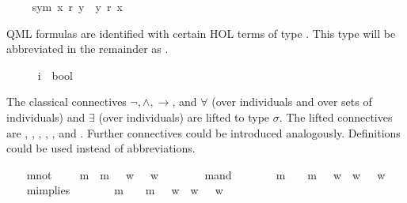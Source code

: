 \begin{isabellebody}
\ \ \isamarkupfalse%
\ \ sym{\isacharcolon}\ {\isachardoublequoteopen}x\ r\ y\ {\isasymlongrightarrow}\ y\ r\ x{\isachardoublequoteclose}%
\begin{isamarkuptext}%
QML formulas are identified with certain HOL terms of type . 
This type will be abbreviated in the remainder as \isa{{\isasymsigma}}.%
\end{isamarkuptext}%
\isamarkuptrue%
\ \ \isamarkupfalse%
\ {\isasymsigma}\ {\isacharequal}\ {\isachardoublequoteopen}{\isacharparenleft}i\ {\isasymRightarrow}\ bool{\isacharparenright}{\isachardoublequoteclose}%
\begin{isamarkuptext}%
The classical connectives $\neg, \wedge, \rightarrow$, and $\forall$
(over individuals and over sets of individuals) and $\exists$ (over individuals) are
lifted to type $\sigma$. The lifted connectives are , , ,
\isa{{\isasymforall}}, \isa{{\isasymPi}}, and \isa{{\isasymexists}}. Further connectives could be introduced analogously. 
Definitions could be used instead of abbreviations.%
\end{isamarkuptext}%
\isamarkuptrue%
\ \ \isamarkupfalse%
\ mnot\ {\isacharcolon}{\isacharcolon}\ {\isachardoublequoteopen}{\isasymsigma}\ {\isasymRightarrow}\ {\isasymsigma}{\isachardoublequoteclose}\ {\isacharparenleft}{\isachardoublequoteopen}m{\isasymnot}{\isachardoublequoteclose}{\isacharparenright}\ \ {\isachardoublequoteopen}m{\isasymnot}\ {\isasymphi}\ {\isasymequiv}\ {\isacharparenleft}{\isasymlambda}w{\isachardot}\ {\isasymnot}\ {\isasymphi}\ w{\isacharparenright}{\isachardoublequoteclose}\ \ \ \ \isanewline
\ \ \isamarkupfalse%
\ mand\ {\isacharcolon}{\isacharcolon}\ {\isachardoublequoteopen}{\isasymsigma}\ {\isasymRightarrow}\ {\isasymsigma}\ {\isasymRightarrow}\ {\isasymsigma}{\isachardoublequoteclose}\ {\isacharparenleft}\ {\isachardoublequoteopen}m{\isasymand}{\isachardoublequoteclose}\ {}{}{\isacharparenright}\ \ {\isachardoublequoteopen}{\isasymphi}\ m{\isasymand}\ {\isasympsi}\ {\isasymequiv}\ {\isacharparenleft}{\isasymlambda}w{\isachardot}\ {\isasymphi}\ w\ {\isasymand}\ {\isasympsi}\ w{\isacharparenright}{\isachardoublequoteclose}\ \ \ \isanewline
\ \ \isamarkupfalse%
\ mimplies\ {\isacharcolon}{\isacharcolon}\ {\isachardoublequoteopen}{\isasymsigma}\ {\isasymRightarrow}\ {\isasymsigma}\ {\isasymRightarrow}\ {\isasymsigma}{\isachardoublequoteclose}\ {\isacharparenleft}\ {\isachardoublequoteopen}m{\isasymRightarrow}{\isachardoublequoteclose}\ {}{}{\isacharparenright}\ \ {\isachardoublequoteopen}{\isasymphi}\ m{\isasymRightarrow}\ {\isasympsi}\ {\isasymequiv}\ {\isacharparenleft}{\isasymlambda}w{\isachardot}\ {\isasymphi}\ w\ {\isasymlongrightarrow}\ {\isasympsi}\ w{\isacharparenright}{\isachardoublequoteclose}\ \ \isanewline

\end{isabellebody}
